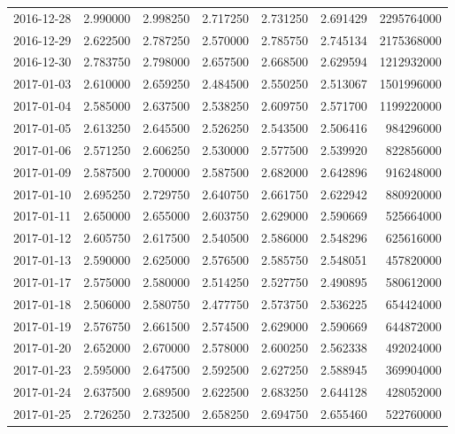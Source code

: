 \begin{tabular}{lrrrrrr}
2016-12-28 &    2.990000 &    2.998250 &    2.717250 &    2.731250 &    2.691429 &  2295764000 \\
2016-12-29 &    2.622500 &    2.787250 &    2.570000 &    2.785750 &    2.745134 &  2175368000 \\
2016-12-30 &    2.783750 &    2.798000 &    2.657500 &    2.668500 &    2.629594 &  1212932000 \\
2017-01-03 &    2.610000 &    2.659250 &    2.484500 &    2.550250 &    2.513067 &  1501996000 \\
2017-01-04 &    2.585000 &    2.637500 &    2.538250 &    2.609750 &    2.571700 &  1199220000 \\
2017-01-05 &    2.613250 &    2.645500 &    2.526250 &    2.543500 &    2.506416 &   984296000 \\
2017-01-06 &    2.571250 &    2.606250 &    2.530000 &    2.577500 &    2.539920 &   822856000 \\
2017-01-09 &    2.587500 &    2.700000 &    2.587500 &    2.682000 &    2.642896 &   916248000 \\
2017-01-10 &    2.695250 &    2.729750 &    2.640750 &    2.661750 &    2.622942 &   880920000 \\
2017-01-11 &    2.650000 &    2.655000 &    2.603750 &    2.629000 &    2.590669 &   525664000 \\
2017-01-12 &    2.605750 &    2.617500 &    2.540500 &    2.586000 &    2.548296 &   625616000 \\
2017-01-13 &    2.590000 &    2.625000 &    2.576500 &    2.585750 &    2.548051 &   457820000 \\
2017-01-17 &    2.575000 &    2.580000 &    2.514250 &    2.527750 &    2.490895 &   580612000 \\
2017-01-18 &    2.506000 &    2.580750 &    2.477750 &    2.573750 &    2.536225 &   654424000 \\
2017-01-19 &    2.576750 &    2.661500 &    2.574500 &    2.629000 &    2.590669 &   644872000 \\
2017-01-20 &    2.652000 &    2.670000 &    2.578000 &    2.600250 &    2.562338 &   492024000 \\
2017-01-23 &    2.595000 &    2.647500 &    2.592500 &    2.627250 &    2.588945 &   369904000 \\
2017-01-24 &    2.637500 &    2.689500 &    2.622500 &    2.683250 &    2.644128 &   428052000 \\
2017-01-25 &    2.726250 &    2.732500 &    2.658250 &    2.694750 &    2.655460 &   522760000 \\

\end{tabular}
